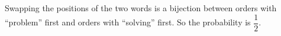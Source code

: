Swapping the positions of the two words is a bijection between orders with ``problem'' first and orders with ``solving'' first. So the probability is $\boxed{\dfrac12}$.
